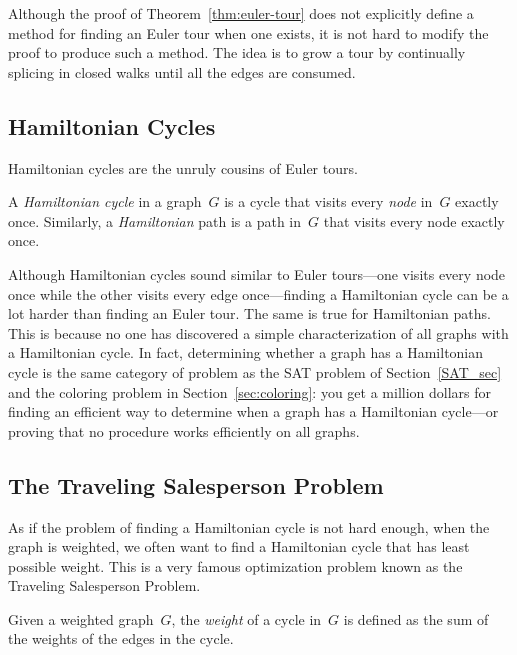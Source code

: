 Although the proof of Theorem~\ref{thm:euler-tour} does not explicitly
define a method for finding an Euler tour when one exists, it is not
hard to modify the proof to produce such a method.  The idea is to
grow a tour by continually splicing in closed walks until all the
edges are consumed.

\subsection{Hamiltonian Cycles}

Hamiltonian cycles are the unruly cousins of Euler tours.

\begin{definition}\label{def:hamiltonian-cycle}
A \emph{Hamiltonian cycle} in a graph~$G$ is a cycle that visits every
\emph{node} in~$G$ exactly once.  Similarly, a \emph{Hamiltonian} path
is a path in~$G$ that visits every node exactly once.
\end{definition}

Although Hamiltonian cycles sound similar to Euler tours---one visits
every node once while the other visits every edge once---finding a
Hamiltonian cycle can be a lot harder than finding an Euler tour.  The
same is true for Hamiltonian paths.  This is because no one has
discovered a simple characterization of all graphs with a Hamiltonian
cycle.  In fact, determining whether a graph has a Hamiltonian cycle
is the same category of problem as the SAT problem of
Section~\ref{SAT_sec} and the coloring problem in
Section~\ref{sec:coloring}: you get a million dollars for finding an
efficient way to determine when a graph has a Hamiltonian cycle---or
proving that no procedure works efficiently on all graphs.

\subsection{The Traveling Salesperson Problem}

As if the problem of finding a Hamiltonian cycle is not hard enough,
when the graph is weighted, we often want to find a Hamiltonian cycle
that has least possible weight.  This is a very famous optimization
problem known as the Traveling Salesperson Problem.

\begin{definition}
Given a weighted graph~$G$, the \emph{weight} of a cycle in~$G$ is
defined as the sum of the weights of the edges in the cycle.
\end{definition}

